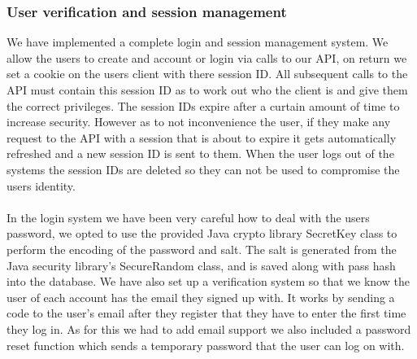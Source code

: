 \documentclass[10pt,a4paper]{article}
\begin{document}
\subsubsection{User verification and session management}
\noindent We have implemented a complete login and session management system. We allow the users to create and account or login via calls to our API, on return we set a cookie on the users client with there session ID. All subsequent calls to the API must contain this session ID as to work out who the client is and give them the correct privileges. The session IDs expire after a curtain amount of time to increase security. However as to not inconvenience the user, if they make any request to the API with a session that is about to expire it gets automatically refreshed and a new session ID is sent to them. When the user logs out of the systems the session IDs are deleted so they can not be used to compromise the users identity.
\\
\\
\noindent In the login system we have been very careful how to deal with the users password, we opted to use the provided Java crypto library SecretKey class to perform the encoding of the password and salt. The salt is generated from the Java security library’s SecureRandom class, and is saved along with pass hash into the database. We have also set up a verification system so that we know the user of each account has the email they signed up with. It works by sending a code to the user's email after they register that they have to enter the first time they log in. As for this we had to add email support we also included a password reset function which sends a temporary password that the user can log on with.  
\\
\\
\end{document}
